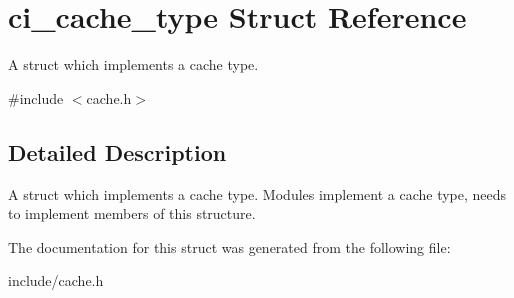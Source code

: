 \hypertarget{structci__cache__type}{
\section{ci\_\-cache\_\-type Struct Reference}
\label{structci__cache__type}
}


A struct which implements a cache type.  


{\ttfamily \#include $<$cache.h$>$}

\subsection{Detailed Description}
A struct which implements a cache type. Modules implement a cache type, needs to implement members of this structure. 

The documentation for this struct was generated from the following file:\begin{DoxyCompactItemize}
\item 
include/cache.h\end{DoxyCompactItemize}

